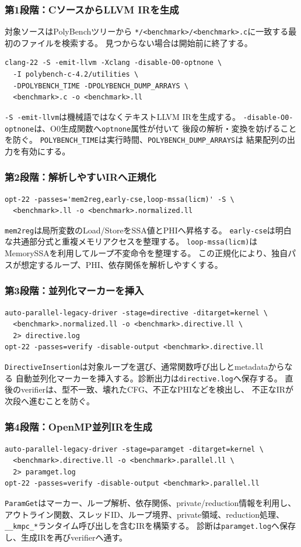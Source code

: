 \documentclass[a4paper,11pt]{ltjsarticle}
\begin{document}
\subsubsection{第1段階：CソースからLLVM IRを生成}
対象ソースはPolyBenchツリーから
\texttt{*/<benchmark>/<benchmark>.c}に一致する最初のファイルを検索する。
見つからない場合は開始前に終了する。
\begin{lstlisting}
clang-22 -S -emit-llvm -Xclang -disable-O0-optnone \
  -I polybench-c-4.2/utilities \
  -DPOLYBENCH_TIME -DPOLYBENCH_DUMP_ARRAYS \
  <benchmark>.c -o <benchmark>.ll
\end{lstlisting}

\texttt{-S -emit-llvm}は機械語ではなくテキストLLVM IRを生成する。
\texttt{-disable-O0-optnone}は、O0生成関数へ\texttt{optnone}属性が付いて
後段の解析・変換を妨げることを防ぐ。
\texttt{POLYBENCH\_TIME}は実行時間、\texttt{POLYBENCH\_DUMP\_ARRAYS}は
結果配列の出力を有効にする。

\subsubsection{第2段階：解析しやすいIRへ正規化}
\begin{lstlisting}
opt-22 -passes='mem2reg,early-cse,loop-mssa(licm)' -S \
  <benchmark>.ll -o <benchmark>.normalized.ll
\end{lstlisting}
\texttt{mem2reg}は局所変数のLoad/StoreをSSA値とPHIへ昇格する。
\texttt{early-cse}は明白な共通部分式と重複メモリアクセスを整理する。
\texttt{loop-mssa(licm)}はMemorySSAを利用してループ不変命令を整理する。
この正規化により、独自パスが想定するループ、PHI、依存関係を解析しやすくする。

\subsubsection{第3段階：並列化マーカーを挿入}
\begin{lstlisting}
auto-parallel-legacy-driver -stage=directive -ditarget=kernel \
  <benchmark>.normalized.ll -o <benchmark>.directive.ll \
  2> directive.log
opt-22 -passes=verify -disable-output <benchmark>.directive.ll
\end{lstlisting}
\texttt{DirectiveInsertion}は対象ループを選び、通常関数呼び出しとmetadataからなる
自動並列化マーカーを挿入する。診断出力は\texttt{directive.log}へ保存する。
直後のverifierは、型不一致、壊れたCFG、不正なPHIなどを検出し、
不正なIRが次段へ進むことを防ぐ。

\subsubsection{第4段階：OpenMP並列IRを生成}
\begin{lstlisting}
auto-parallel-legacy-driver -stage=paramget -ditarget=kernel \
  <benchmark>.directive.ll -o <benchmark>.parallel.ll \
  2> paramget.log
opt-22 -passes=verify -disable-output <benchmark>.parallel.ll
\end{lstlisting}
\texttt{ParamGet}はマーカー、ループ解析、依存関係、private/reduction情報を利用し、
アウトライン関数、スレッドID、ループ境界、private領域、reduction処理、
\texttt{\_\_kmpc\_*}ランタイム呼び出しを含むIRを構築する。
診断は\texttt{paramget.log}へ保存し、生成IRを再びverifierへ通す。
\end{document}
